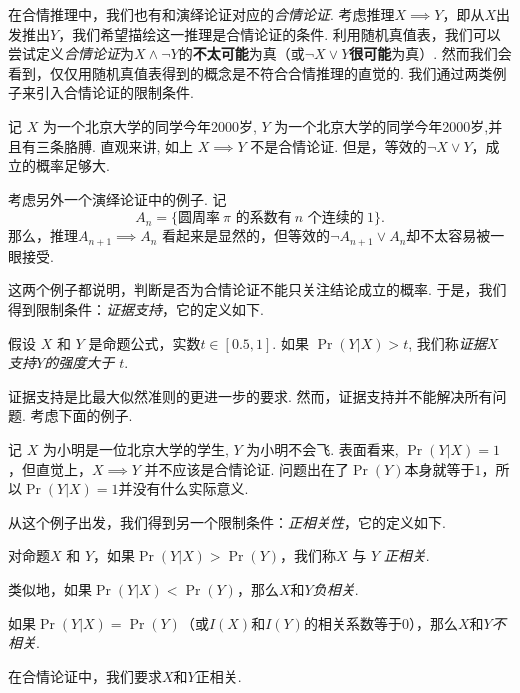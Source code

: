 在合情推理中，我们也有和演绎论证对应的\textit{合情论证}. 考虑推理$X\implies Y$，即从$X$出发推出$Y$，我们希望描绘这一推理是合情论证的条件. 利用随机真值表，我们可以尝试定义\textit{合情论证}为$X\wedge\neg Y$的\textbf{不太可能}为真（或$\neg X\vee Y$\textbf{很可能}为真）. 然而我们会看到，仅仅用随机真值表得到的概念是不符合合情推理的直觉的. 我们通过两类例子来引入合情论证的限制条件.



\begin{example}[奇怪的例子一]
记 $X$ 为一个北京大学的同学今年2000岁, $Y$ 为一个北京大学的同学今年2000岁,并且有三条胳膊. 直观来讲, 如上 $X\implies Y$ 不是合情论证. 但是，等效的$\neg X\vee Y$，成立的概率足够大.

考虑另外一个演绎论证中的例子. 记
\[A_n=\{\text{圆周率}~\pi\text{ 的系数有}~n\text{ 个连续的}~1\}.\]
那么，推理$A_{n+1} \implies A_n$ 看起来是显然的，但等效的$\neg A_{n+1} \vee A_n$却不太容易被一眼接受.
\end{example}
这两个例子都说明，判断是否为合情论证不能只关注结论成立的概率. 于是，我们得到限制条件：\textit{证据支持}，它的定义如下. 
\begin{definition}[证据支持]
    假设 $X$ 和 $Y$ 是命题公式，实数$t\in [0.5, 1]$. 如果 $\Pr(Y|X)>t$, 我们称\textit{证据$X$支持$Y$的强度大于 $t$}. 
\end{definition}

证据支持是比最大似然准则的更进一步的要求. 然而，证据支持并不能解决所有问题. 考虑下面的例子.

\begin{example}[奇怪的例子二]
记 $X$ 为小明是一位北京大学的学生, $Y$ 为小明不会飞. 表面看来, $\Pr(Y|X)=1$，但直觉上，$X\implies Y$ 并不应该是合情论证. 问题出在了$\Pr(Y)$本身就等于$1$，所以$\Pr(Y|X)=1$并没有什么实际意义.
\end{example}

从这个例子出发，我们得到另一个限制条件：\textit{正相关性}，它的定义如下. 

\begin{definition}[相关性]
    对命题$X$ 和 $Y$，如果$\Pr(Y|X) > \Pr(Y)$，我们称$X$ 与 $Y$ \textit{正相关}. 
    
    类似地，如果$\Pr(Y|X) < \Pr(Y)$，那么$X$和$Y$\textit{负相关}.
    
    如果$\Pr(Y|X) = \Pr(Y)$（或$I(X)$和$I(Y)$的相关系数等于$0$），那么$X$和$Y$\textit{不相关}. 
    
    在合情论证中，我们要求$X$和$Y$正相关.
\end{definition}

